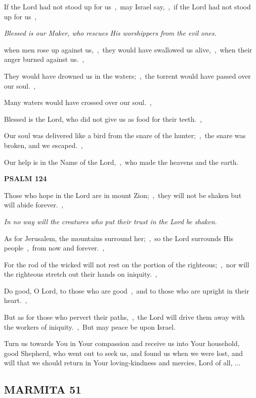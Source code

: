 \documentclass[12pt,twoside,a5paper]{article}
\newcommand{\marmita}[1]{\subsection*{MARMITA {#1}}}
\newcommand{\psalm}[1]{\textbf{PSALM {#1}}\nopagebreak}
\newcommand{\qanona}[1]{{\liturgicalhint{Qanona.} \emph{#1}}}
\newcommand{\slota}[1]{\liturgicalhint{Slota.} #1}
\begin{document}
\begin{normalparskip}
  If the Lord had not stood up for us~\sep\ may Israel say,~\sep\ if the Lord had not stood up for us~\sep

  \qanona{Blessed is our Maker, who rescues His worshippers from the evil ones.}

  when men rose up against us,~\sep\ they would have swallowed us alive,~\sep\ when their anger burned against us.~\sep

  They would have drowned us in the waters;~\sep\ the torrent would have passed over our soul.~\sep

  Many waters would have crossed over our soul.~\sep

  Blessed is the Lord, who did not give us as food for their teeth.~\sep

  Our soul was delivered like a bird from the snare of the hunter;~\sep\ the snare was broken, and we escaped.~\sep

  Our help is in the Name of the Lord,~\sep\ who made the heavens and the earth.
\end{normalparskip}

\psalm{124}

\begin{normalparskip}
  Those who hope in the Lord are in mount Zion;~\sep\ they will not be shaken but will abide forever.~\sep

  \qanona{In no way will the creatures who put their trust in the Lord be shaken.}

  As for Jerusalem, the mountains surround her;~\sep\ so the Lord surrounds His people~\sep\ from now and forever.~\sep

  For the rod of the wicked will not rest on the portion of the righteous;~\sep\ nor will the righteous stretch out their hands on iniquity.~\sep

  Do good, O Lord, to those who are good~\sep\ and to those who are upright in their heart.~\sep

  But as for those who pervert their paths,~\sep\ the Lord will drive them away with the workers of iniquity.~\sep\ But may peace be upon Israel.
\end{normalparskip}

\slota{Turn us towards You in Your compassion and receive us into Your household, good Shepherd, who went out to seek us, and found us when we were lost, and will that we should return in Your loving-kindness and mercies, Lord of all, ...}

\marmita{51}
\end{document}
